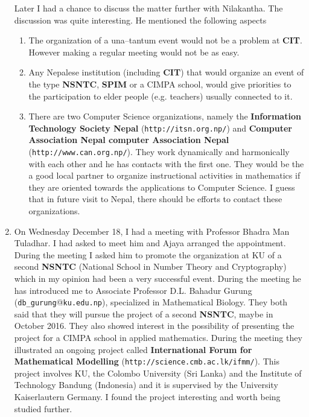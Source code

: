 \documentclass[12pt]{scrartcl}
\begin{document}
\begin{enumerate}
Later I had a chance to discuss the matter further with Nilakantha. The discussion was quite interesting. He mentioned the following aspects
\begin{enumerate}
\item The organization of a una--tantum event would not be a problem at \textbf{CIT}. However making a regular meeting would not be as easy.
\item Any Nepalese institution (including \textbf{CIT}) that would organize an event of the type \textbf{NSNTC}, \textbf{SPIM} or a CIMPA school, would 
give priorities to the participation to elder people (e.g. teachers) usually connected to it. 
\item There are two Computer Science organizations, namely the \textbf{Information Technology Society Nepal} (\texttt{http://itsn.org.np/}) and 
\textbf{Computer Association Nepal computer Association Nepal} (\texttt{http://www.can.org.np/}). 
They work dynamically and harmonically with each other and he has contacts with the first one. 
They would be the a good local partner to organize instructional activities in mathematics if they are oriented towards the applications to
Computer Science. I guess that in future visit to Nepal, there should be efforts to contact these organizations. 
\end{enumerate}
  

\item On Wednesday December 18, I had a meeting with Professor Bhadra Man Tuladhar. I had asked to meet him and Ajaya arranged the appointment. 
During the meeting I asked him to promote the organization at KU of a second \textbf{NSNTC} (National School in Number Theory and Cryptography)
which in my opinion had been a very successful event. During the meeting he has introduced me to Associate Professor D.L. Bahadur Gurung 
(\texttt{db\_gurung}@\texttt{ku.edu.np}), specialized in Mathematical Biology. They both said that they will pursue the project of a second
\textbf{NSNTC}, maybe in October 2016. They also showed interest in the possibility of presenting the project for a CIMPA school in applied 
mathematics. During the meeting they illustrated an ongoing project called \textbf{International Forum for Mathematical Modelling} 
(\texttt{http://science.cmb.ac.lk/ifmm/}). This project involves KU, the Colombo University (Sri Lanka) and the 
Institute of Technology Bandung (Indonesia) and it is supervised by the University Kaiserlautern Germany. I found the project interesting
and worth being studied further.


\end{enumerate}
\end{document}
